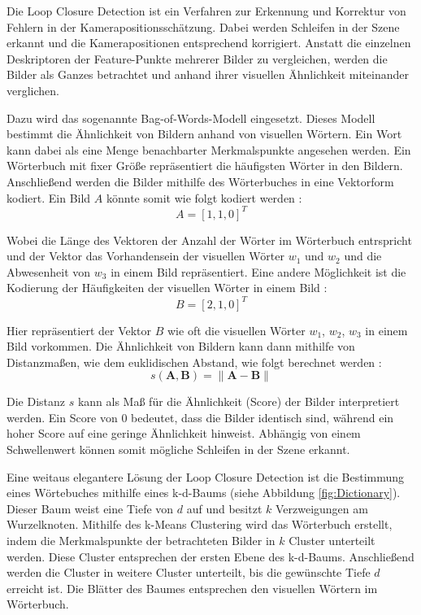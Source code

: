 Die Loop Closure Detection ist ein Verfahren zur Erkennung und Korrektur von Fehlern in der Kamerapositionsschätzung. Dabei werden Schleifen in der Szene erkannt und die Kamerapositionen entsprechend korrigiert. Anstatt die einzelnen Deskriptoren der Feature-Punkte mehrerer Bilder zu vergleichen, werden die Bilder als Ganzes betrachtet und anhand ihrer visuellen Ähnlichkeit miteinander verglichen. \cite{gao2021vSLAM, cadena2016slam}

Dazu wird das sogenannte Bag-of-Words-Modell eingesetzt. Dieses Modell bestimmt die Ähnlichkeit von Bildern anhand von visuellen Wörtern. Ein Wort kann dabei als eine Menge benachbarter Merkmalspunkte angesehen werden. Ein Wörterbuch mit fixer Größe repräsentiert die häufigsten Wörter in den Bildern. Anschließend werden die Bilder mithilfe des Wörterbuches in eine Vektorform kodiert. Ein Bild \( A \) könnte somit wie folgt kodiert werden \cite{gao2021vSLAM, yoon2024BoW}: 
\begin{equation}
    A = [1, 1, 0]^T
\end{equation}

Wobei die Länge des Vektoren der Anzahl der Wörter im Wörterbuch entrspricht und der Vektor das Vorhandensein der visuellen Wörter \( w_1 \) und \( w_2 \) und die Abwesenheit von \( w_3 \) in einem Bild repräsentiert. Eine andere Möglichkeit ist die Kodierung der Häufigkeiten der visuellen Wörter in einem Bild \cite{gao2021vSLAM}:
\begin{equation}
    B = [2, 1, 0]^T
\end{equation}

Hier repräsentiert der Vektor \( B \) wie oft die visuellen Wörter \( w_1 \), \( w_2 \), \( w_3 \) in einem Bild vorkommen. Die Ähnlichkeit von Bildern kann dann mithilfe von Distanzmaßen, wie dem euklidischen Abstand, wie folgt berechnet werden \cite{gao2021vSLAM}:
\begin{equation}
    s(\mathbf{A}, \mathbf{B}) = \|\mathbf{A} - \mathbf{B}\|
\end{equation}

Die Distanz \( s \) kann als Maß für die Ähnlichkeit (Score) der Bilder interpretiert werden. Ein Score von 0 bedeutet, dass die Bilder identisch sind, während ein hoher Score auf eine geringe Ähnlichkeit hinweist. Abhängig von einem Schwellenwert können somit mögliche Schleifen in der Szene erkannt. \cite{gao2021vSLAM}

Eine weitaus elegantere Lösung der Loop Closure Detection ist die Bestimmung eines Wörtebuches mithilfe eines k-d-Baums (siehe Abbildung \ref{fig:Dictionary}). Dieser Baum weist eine Tiefe von \( d \) auf und besitzt \( k \) Verzweigungen am Wurzelknoten. Mithilfe des k-Means Clustering wird das Wörterbuch erstellt, indem die Merkmalspunkte der betrachteten Bilder in \( k \) Cluster unterteilt werden. Diese Cluster entsprechen der ersten Ebene des k-d-Baums. Anschließend werden die Cluster in weitere Cluster unterteilt, bis die gewünschte Tiefe \( d \) erreicht ist. Die Blätter des Baumes entsprechen den visuellen Wörtern im Wörterbuch. \cite{gao2021vSLAM}

